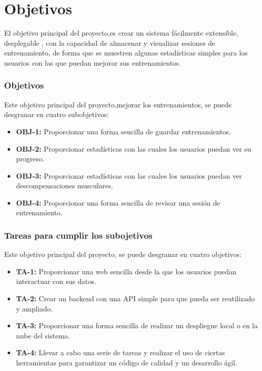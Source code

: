 \chapter{Objetivos}

El objetivo principal del proyecto,es crear un sistema fácilmente extensible, desplegable , con la capacidad de almacenar y visualizar sesiones de entrenamiento, de forma que se muestren algunas estadísticas simples para los usuarios con las que puedan mejorar sus entrenamientos. 

\subsection{Objetivos}
Este objetivo principal del proyecto,mejorar los entrenamientos, se puede desgranar en cuatro subobjetivos:

\begin{itemize}
  \item \textbf{OBJ-1:} Proporcionar una forma sencilla de guardar entrenamientos.
  \item \textbf{OBJ-2:} Proporcionar estadísticas con las cuales los usuarios puedan ver su progreso.
  \item \textbf{OBJ-3:} Proporcionar estadísticas con las cuales los usuarios puedan ver descompensaciones musculares.
  \item \textbf{OBJ-4:} Proporcionar una forma sencilla de revisar una sesión de entrenamiento.
\end{itemize}


\subsection{Tareas para cumplir los subojetivos }
Este objetivo principal del proyecto, se puede desgranar en cuatro objetivos:

\begin{itemize}
  \item \textbf{TA-1:} Proporcionar una web sencilla desde la que los usuarios puedan interactuar con sus datos.
  \item \textbf{TA-2:} Crear un backend con una API simple para que pueda ser reutilizado y ampliado.
  \item \textbf{TA-3:} Proporcionar una forma sencilla de realizar un despliegue local o en la nube del sistema.
  \item \textbf{TA-4:} Llevar a cabo una serie de tareas y realizar el uso de ciertas herramientas para garantizar un código de calidad y un desarrollo ágil.
\end{itemize}

